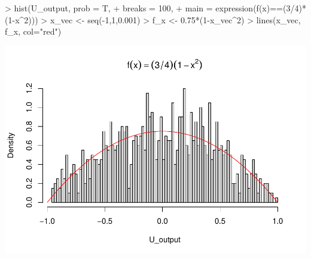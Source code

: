 \documentclass[
]{article}
\newenvironment{Shaded}{\begin{snugshade}}{\end{snugshade}}
\newcommand{\AttributeTok}[1]{\textcolor[rgb]{0.77,0.63,0.00}{#1}}
\newcommand{\DecValTok}[1]{\textcolor[rgb]{0.00,0.00,0.81}{#1}}
\newcommand{\FloatTok}[1]{\textcolor[rgb]{0.00,0.00,0.81}{#1}}
\newcommand{\FunctionTok}[1]{\textcolor[rgb]{0.00,0.00,0.00}{#1}}
\newcommand{\NormalTok}[1]{#1}
\newcommand{\OtherTok}[1]{\textcolor[rgb]{0.56,0.35,0.01}{#1}}
\newcommand{\SpecialCharTok}[1]{\textcolor[rgb]{0.00,0.00,0.00}{#1}}
\newcommand{\StringTok}[1]{\textcolor[rgb]{0.31,0.60,0.02}{#1}}
\begin{document}
\begin{Shaded}
\begin{Highlighting}[]
\SpecialCharTok{\textgreater{}} \FunctionTok{hist}\NormalTok{(U\_output, }\AttributeTok{prob =}\NormalTok{ T, }
\SpecialCharTok{+}      \AttributeTok{breaks =} \DecValTok{100}\NormalTok{, }
\SpecialCharTok{+}      \AttributeTok{main =} \FunctionTok{expression}\NormalTok{(}\FunctionTok{f}\NormalTok{(x)}\SpecialCharTok{==}\NormalTok{(}\DecValTok{3}\SpecialCharTok{/}\DecValTok{4}\NormalTok{)}\SpecialCharTok{*}\NormalTok{(}\DecValTok{1}\SpecialCharTok{{-}}\NormalTok{x}\SpecialCharTok{\^{}}\DecValTok{2}\NormalTok{)))}
\SpecialCharTok{\textgreater{}}\NormalTok{ x\_vec }\OtherTok{\textless{}{-}} \FunctionTok{seq}\NormalTok{(}\SpecialCharTok{{-}}\DecValTok{1}\NormalTok{,}\DecValTok{1}\NormalTok{,}\FloatTok{0.001}\NormalTok{)}
\SpecialCharTok{\textgreater{}}\NormalTok{ f\_x }\OtherTok{\textless{}{-}} \FloatTok{0.75}\SpecialCharTok{*}\NormalTok{(}\DecValTok{1}\SpecialCharTok{{-}}\NormalTok{x\_vec}\SpecialCharTok{\^{}}\DecValTok{2}\NormalTok{)}
\SpecialCharTok{\textgreater{}} \FunctionTok{lines}\NormalTok{(x\_vec, f\_x, }\AttributeTok{col=}\StringTok{"red"}\NormalTok{)}
\end{Highlighting}
\end{Shaded}

\includegraphics[width=1\linewidth,height=0.4\textheight]{HW_02_Chenguang_Pan_files/figure-latex/unnamed-chunk-3-1}
\end{document}
